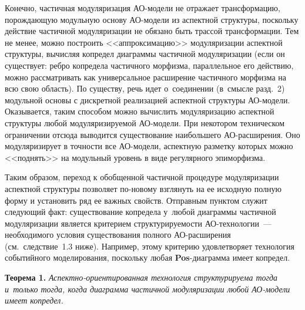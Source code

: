\begin{multicols}{2}
 Конечно, частичная модуляризация АО-мо\-де\-ли не отражает
трансформацию, порождающую модульную основу АО-мо\-де\-ли из аспектной
структуры, поскольку действие частичной модуляризации не обязано быть
трассой трансформации. Тем не менее, можно построить <<аппроксимацию>>
модуляризации аспектной структуры, вычисляя копредел диаграммы частичной
модуляризации (если он существует: ребро копредела частичного морфизма,
параллельное его действию, можно рас\-смат\-ри\-вать как универсальное
расширение частичного морфизма на всю свою область). По существу, речь
идет о~соединении (в~смысле разд.~2) модульной основы с дискретной
реализацией аспектной структуры АО-мо\-де\-ли. Оказывается, таким способом
можно вычислить модуляризацию аспектной структуры любой
модуляризируемой АО-мо\-де\-ли. При некотором техническом ограничении
отсюда выводится существование наибольшего АО-рас\-ши\-ре\-ния. Оно
модуляризирует в точности все АО-мо\-де\-ли, аспектную разметку которых
можно <<поднять>> на модульный уровень в виде регулярного эпи\-мор\-физма.
{

}

 Таким образом, переход к обобщенной частичной процедуре модуляризации
аспектной структуры позволяет по-но\-во\-му взглянуть на ее исходную
полную форму и установить ряд ее важных свойств. Отправным пунктом
служит следующий факт: существование копредела у~любой диаграммы
частичной модуляризации является критерием структурируемости
 АО-тех\-но\-ло\-гии~--- необходимого условия существования полного
 АО-рас\-ши\-ре\-ния (см.\ следствие~1.3 ниже). Например, этому критерию
удовлетворяет технология событийного моделирования, поскольку любая
 \textbf{Pos}-диа\-грам\-ма имеет копредел.

 \medskip

 \noindent
 \textbf{Теорема 1.} \textit{Аспектно-ориентированная тех\-но\-ло\-гия
 структурируема тогда
и~только тогда, когда диаграмма частичной модуляризации любой
 АО-мо\-де\-ли имеет копредел.}

 \medskip


\end{multicols}
